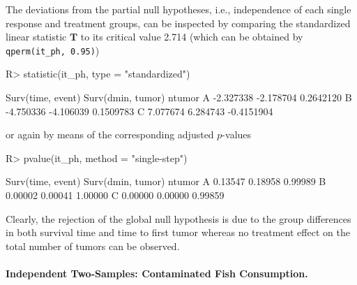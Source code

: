\documentclass{article}
\newcommand{\T}{\mathbf{T}}
\newenvironment{Schunk}{}{}
\begin{document}
The deviations from the partial null hypotheses, i.e., independence of
each single response and treatment groups, can be inspected by comparing the standardized
linear statistic $\T$ to its critical value 2.714
(which can be obtained by \verb+qperm(it_ph, 0.95)+)
\begin{Schunk}
\begin{Sinput}
R> statistic(it_ph, type = "standardized")
\end{Sinput}
\begin{Soutput}
  Surv(time, event) Surv(dmin, tumor)     ntumor
A         -2.327338         -2.178704  0.2642120
B         -4.750336         -4.106039  0.1509783
C          7.077674          6.284743 -0.4151904
\end{Soutput}
\end{Schunk}
or again by means of the corresponding adjusted $p$-values
\begin{Schunk}
\begin{Sinput}
R> pvalue(it_ph, method = "single-step")
\end{Sinput}
\end{Schunk}
\begin{Schunk}
\begin{Soutput}
  Surv(time, event) Surv(dmin, tumor)  ntumor
A           0.13547           0.18958 0.99989
B           0.00002           0.00041 1.00000
C           0.00000           0.00000 0.99859
\end{Soutput}
\end{Schunk}
Clearly, the rejection of the global null hypothesis is due to the
group differences in both survival time and time to first tumor whereas 
no treatment effect on the total number of tumors can be observed.

\paragraph{Independent Two-Samples: Contaminated Fish Consumption.}
\end{document}
